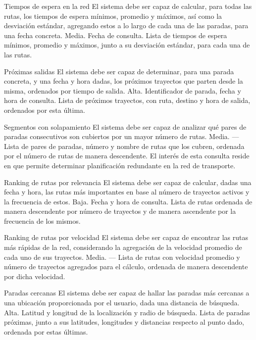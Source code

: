 \freq
    {Tiempos de espera en la red}
    {El sistema debe ser capaz de calcular, para todas las rutas, los tiempos de espera mínimos, promedio y máximos, así como la desviación estándar, agregando estos a lo largo de cada una de las paradas, para una fecha concreta.}
    {Media.}
    {Fecha de consulta.}
    {Lista de tiempos de espera mínimos, promedio y máximos, junto a su desviación estándar, para cada una de las rutas.}
    {}

\freq
    {Próximas salidas}
    {El sistema debe ser capaz de determinar, para una parada concreta, y una fecha y hora dadas, los próximos trayectos que parten desde la misma, ordenados por tiempo de salida.}
    {Alta.}
    {Identificador de parada, fecha y hora de consulta.}
    {Lista de próximos trayectos, con ruta, destino y hora de salida, ordenados por esta última.}
    {}

\freq
    {Segmentos con solapamiento}
    {El sistema debe ser capaz de analizar qué pares de paradas consecutivos son cubiertos por un mayor número de rutas.}
    {Media.}
    {—}
    {Lista de pares de paradas, número y nombre de rutas que los cubren, ordenada por el número de rutas de manera descendente.}
    {El interés de esta consulta reside en que permite determinar planificación redundante en la red de transporte.}

\freq
    {Ranking de rutas por relevancia}
    {El sistema debe ser capaz de calcular, dadas una fecha y hora, las rutas más importantes en base al número de trayectos activos y la frecuencia de estos.}
    {Baja.}
    {Fecha y hora de consulta.}
    {Lista de rutas ordenada de manera descendente por número de trayectos y de manera ascendente por la frecuencia de los mismos.}
    {}

\freq
    {Ranking de rutas por velocidad}
    {El sistema debe ser capaz de encontrar las rutas más rápidas de la red, considerando la agregación de la velocidad promedio de cada uno de sus trayectos.}
    {Media.}
    {—}
    {Lista de rutas con velocidad promedio y número de trayectos agregados para el cálculo, ordenada de manera descendente por dicha velocidad.}
    {}

\freq
    {Paradas cercanas}
    {El sistema debe ser capaz de hallar las paradas más cercanas a una ubicación proporcionada por el usuario, dada una distancia de búsqueda.}
    {Alta.}
    {Latitud y longitud de la localización y radio de búsqueda.}
    {Lista de paradas próximas, junto a sus latitudes, longitudes y distancias respecto al punto dado, ordenada por estas últimas.}
    {}


